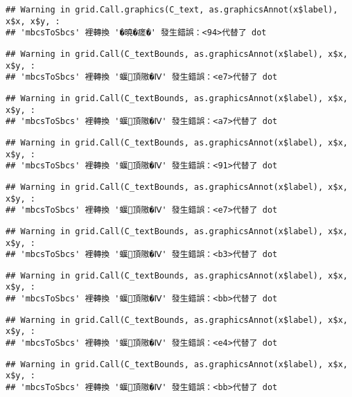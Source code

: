 \documentclass[
]{article}
\begin{document}
\begin{verbatim}
## Warning in grid.Call.graphics(C_text, as.graphicsAnnot(x$label), x$x, x$y, :
## 'mbcsToSbcs' 裡轉換 '�曉�瘥�' 發生錯誤：<94>代替了 dot
\end{verbatim}

\begin{verbatim}
## Warning in grid.Call(C_textBounds, as.graphicsAnnot(x$label), x$x, x$y, :
## 'mbcsToSbcs' 裡轉換 '蝘頂隞�Ⅳ' 發生錯誤：<e7>代替了 dot
\end{verbatim}

\begin{verbatim}
## Warning in grid.Call(C_textBounds, as.graphicsAnnot(x$label), x$x, x$y, :
## 'mbcsToSbcs' 裡轉換 '蝘頂隞�Ⅳ' 發生錯誤：<a7>代替了 dot
\end{verbatim}

\begin{verbatim}
## Warning in grid.Call(C_textBounds, as.graphicsAnnot(x$label), x$x, x$y, :
## 'mbcsToSbcs' 裡轉換 '蝘頂隞�Ⅳ' 發生錯誤：<91>代替了 dot
\end{verbatim}

\begin{verbatim}
## Warning in grid.Call(C_textBounds, as.graphicsAnnot(x$label), x$x, x$y, :
## 'mbcsToSbcs' 裡轉換 '蝘頂隞�Ⅳ' 發生錯誤：<e7>代替了 dot
\end{verbatim}

\begin{verbatim}
## Warning in grid.Call(C_textBounds, as.graphicsAnnot(x$label), x$x, x$y, :
## 'mbcsToSbcs' 裡轉換 '蝘頂隞�Ⅳ' 發生錯誤：<b3>代替了 dot
\end{verbatim}

\begin{verbatim}
## Warning in grid.Call(C_textBounds, as.graphicsAnnot(x$label), x$x, x$y, :
## 'mbcsToSbcs' 裡轉換 '蝘頂隞�Ⅳ' 發生錯誤：<bb>代替了 dot
\end{verbatim}

\begin{verbatim}
## Warning in grid.Call(C_textBounds, as.graphicsAnnot(x$label), x$x, x$y, :
## 'mbcsToSbcs' 裡轉換 '蝘頂隞�Ⅳ' 發生錯誤：<e4>代替了 dot
\end{verbatim}

\begin{verbatim}
## Warning in grid.Call(C_textBounds, as.graphicsAnnot(x$label), x$x, x$y, :
## 'mbcsToSbcs' 裡轉換 '蝘頂隞�Ⅳ' 發生錯誤：<bb>代替了 dot
\end{verbatim}
\end{document}
